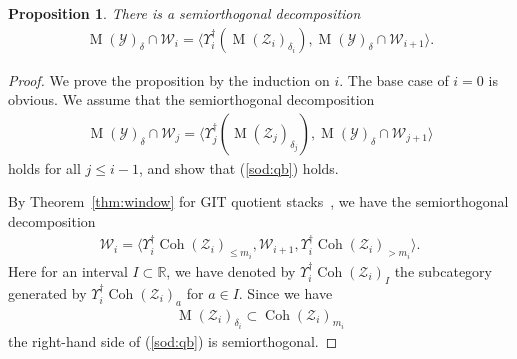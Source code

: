 \documentclass [11pt,oneside,a4paper,mathscr]{amsart}
\newtheorem{prop}[thm]{Proposition}
\theoremstyle{definition}
\renewcommand{\leq}{\leqslant}
\newcommand{\MM}{\operatorname{M}}
\newcommand{\Coh}{\operatorname{Coh}}
\begin{document}
\begin{prop}\label{prop:sod:qb}
There is a semiorthogonal decomposition 
\begin{align}\label{sod:qb}
\MM(\mathcal{Y})_{\delta} \cap \mathcal{W}_i=
\langle \Upsilon_i^{\dag}(\MM(\mathcal{Z}_i)_{\delta_i}), \MM(\mathcal{Y})_{\delta} \cap \mathcal{W}_{i+1} \rangle. 
\end{align}
    \end{prop}
    \begin{proof}
We prove the proposition by the induction on $i$. 
The base case of $i=0$ is obvious. We
assume that the semiorthogonal decomposition
\begin{align}\label{sod:qb:ind}
\MM(\mathcal{Y})_{\delta} \cap \mathcal{W}_j=
\langle \Upsilon_j^{\dag}(\MM(\mathcal{Z}_j)_{\delta_j}), \MM(\mathcal{Y})_{\delta} \cap \mathcal{W}_{j+1} \rangle
\end{align}
holds for all $j\leq i-1$, and show that (\ref{sod:qb}) holds. 
    
        By Theorem~\ref{thm:window} for GIT quotient stacks~\cite{MR3895631, halp}, 
        we have the semiorthogonal decomposition 
        \begin{align}\label{window}
        \mathcal{W}_i=\langle 
            \Upsilon_i^{\dag}\Coh(\mathcal{Z}_i)_{\leq m_i}, \mathcal{W}_{i+1}, \Upsilon_i^{\dag}\Coh(\mathcal{Z}_i)_{>m_i} \rangle. 
        \end{align}
        Here for an interval $I\subset \mathbb{R}$, we have denoted by 
        $\Upsilon_i^{\dag}\Coh(\mathcal{Z}_i)_I$ the subcategory generated by 
        $\Upsilon_i^{\dag}\Coh(\mathcal{Z}_i)_a$ for $a \in I$. 
        Since we have 
        \begin{align*}
            \MM(\mathcal{Z}_i)_{\delta_i} \subset \Coh(\mathcal{Z}_i)_{m_i}
        \end{align*}
        the right-hand side of (\ref{sod:qb}) is semiorthogonal. 


\end{proof}
\end{document}
